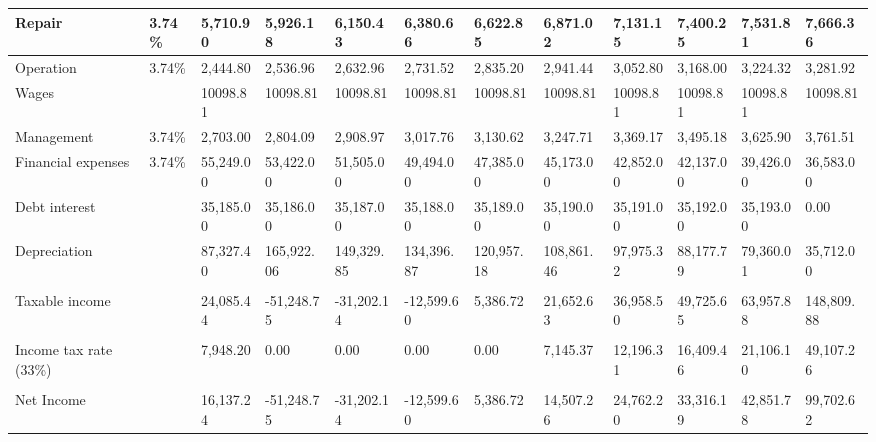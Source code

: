 \documentclass[12pt]{article}
\begin{document}
\begin{landscape}
\begin{table}[htbp]
\begin{tabular}{|p{9.91em}|l|l|l|l|l|l|l|l|l|l|l|}
    \hline
    Repair & 3.74\% & 5,710.90 & 5,926.18 & 6,150.43 & 6,380.66 & 6,622.85 & 6,871.02 & 7,131.15 & 7,400.25 & 7,531.81 & 7,666.36 \\
    \hline
         Operation & 3.74\% & 2,444.80 & 2,536.96 & 2,632.96 & 2,731.52 & 2,835.20 & 2,941.44 & 3,052.80 & 3,168.00 & 3,224.32 & 3,281.92 \\
    \hline
    Wages &       & 10098.81 & 10098.81 & 10098.81 & 10098.81 & 10098.81 & 10098.81 & 10098.81 & 10098.81 & 10098.81 & 10098.81 \\
    \hline
              Management & 3.74\% & 2,703.00 & 2,804.09 & 2,908.97 & 3,017.76 & 3,130.62 & 3,247.71 & 3,369.17 & 3,495.18 & 3,625.90 & 3,761.51 \\
    \hline
                       Financial expenses & 3.74\% & 55,249.00 & 53,422.00 & 51,505.00 & 49,494.00 & 47,385.00 & 45,173.00 & 42,852.00 & 42,137.00 & 39,426.00 & 36,583.00 \\
    \hline
             Debt interest  &       & 35,185.00 & 35,186.00 & 35,187.00 & 35,188.00 & 35,189.00 & 35,190.00 & 35,191.00 & 35,192.00 & 35,193.00 & 0.00 \\
    \hline
              Depreciation &       & 87,327.40 & 165,922.06 & 149,329.85 & 134,396.87 & 120,957.18 & 108,861.46 & 97,975.32 & 88,177.79 & 79,360.01 & 35,712.00 \\
    \hline
    \multicolumn{1}{|l|}{} &       & \textcolor[rgb]{ 0,  .502,  0}{} &       &       &       &       &       &       &       &       &  \\
    \hline
    Taxable income &       & 24,085.44 & \textcolor[rgb]{ 1,  0,  0}{-51,248.75} & \textcolor[rgb]{ 1,  0,  0}{-31,202.14} & \textcolor[rgb]{ 1,  0,  0}{-12,599.60} & 5,386.72 & 21,652.63 & 36,958.50 & 49,725.65 & 63,957.88 & 148,809.88 \\
    \hline
    \multicolumn{1}{|l|}{} &       &       &       &       &       &       &       &       &       &       &  \\
    \hline
    Income tax rate (33\%) &       & 7,948.20 & 0.00  & 0.00  & 0.00  & 0.00  & 7,145.37 & 12,196.31 & 16,409.46 & 21,106.10 & 49,107.26 \\
    \hline
    \multicolumn{1}{|l|}{} &       &       &       &       &       &       &       &       &       &       &  \\
    \hline
    Net Income  &       & 16,137.24 & \textcolor[rgb]{ 1,  0,  0}{-51,248.75} & \textcolor[rgb]{ 1,  0,  0}{-31,202.14} & \textcolor[rgb]{ 1,  0,  0}{-12,599.60} & 5,386.72 & 14,507.26 & 24,762.20 & 33,316.19 & 42,851.78 & 99,702.62 \\
    \bottomrule
    \end{tabular}%
  \label{tab:addlabel}%
\end{table}%
\end{landscape}
\end{document}
